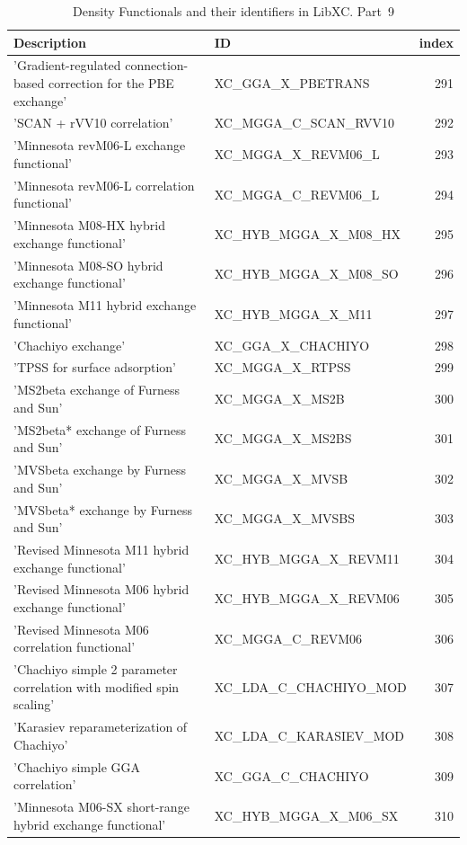 \documentclass[final,12pt,makeidx,DIV=calc]{article}
\begin{document}
{{{{{{\begin{table}[!h]
\caption{Density Functionals and their identifiers in LibXC. Part~9}
\begin{center}
\begin{tabular}{llr}
\hline
\hline
Description & ID & index\\
\hline
  'Gradient-regulated connection-based correction for the PBE exchange' & XC\_GGA\_X\_PBETRANS  &291\\
  'SCAN + rVV10 correlation' & XC\_MGGA\_C\_SCAN\_RVV10  &292\\
  'Minnesota revM06-L exchange functional' & XC\_MGGA\_X\_REVM06\_L  &293\\
  'Minnesota revM06-L correlation functional' & XC\_MGGA\_C\_REVM06\_L  &294\\
  'Minnesota M08-HX hybrid exchange functional' & XC\_HYB\_MGGA\_X\_M08\_HX  &295\\
  'Minnesota M08-SO hybrid exchange functional' & XC\_HYB\_MGGA\_X\_M08\_SO  &296\\
  'Minnesota M11 hybrid exchange functional' & XC\_HYB\_MGGA\_X\_M11  &297\\
  'Chachiyo exchange' & XC\_GGA\_X\_CHACHIYO  &298\\
  'TPSS for surface adsorption' & XC\_MGGA\_X\_RTPSS  &299\\
  'MS2beta exchange of Furness and Sun' & XC\_MGGA\_X\_MS2B  &300\\
  'MS2beta* exchange of Furness and Sun' & XC\_MGGA\_X\_MS2BS  &301\\
  'MVSbeta exchange by Furness and Sun' & XC\_MGGA\_X\_MVSB  &302\\
  'MVSbeta* exchange by Furness and Sun' & XC\_MGGA\_X\_MVSBS  &303\\
  'Revised Minnesota M11 hybrid exchange functional' & XC\_HYB\_MGGA\_X\_REVM11  &304\\
  'Revised Minnesota M06 hybrid exchange functional' & XC\_HYB\_MGGA\_X\_REVM06  &305\\
  'Revised Minnesota M06 correlation functional' & XC\_MGGA\_C\_REVM06  &306\\
  'Chachiyo simple 2 parameter correlation with modified spin scaling' & XC\_LDA\_C\_CHACHIYO\_MOD  &307\\
  'Karasiev reparameterization of Chachiyo' & XC\_LDA\_C\_KARASIEV\_MOD  &308\\
  'Chachiyo simple GGA correlation' & XC\_GGA\_C\_CHACHIYO  &309\\
  'Minnesota M06-SX short-range hybrid exchange functional' & XC\_HYB\_MGGA\_X\_M06\_SX  &310\\

\end{tabular}
\end{center}
\end{table}}}}}}}
\end{document}
